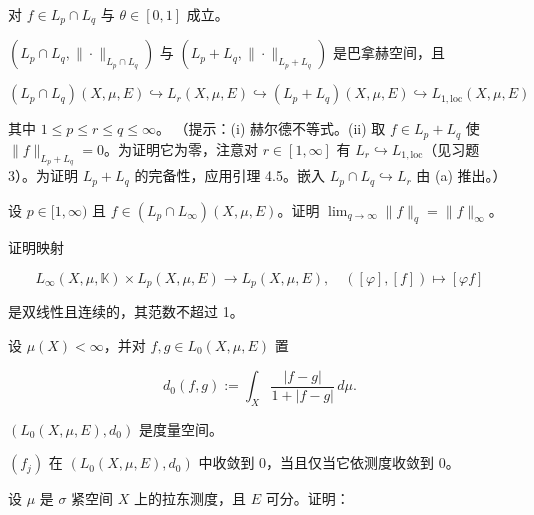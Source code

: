 \begin{exercises}
\begin{subitems}
对 $ f \in L_p \cap L_q $ 与 $ \theta \in [0,1] $ 成立。

\item

$ (L_p\cap L_q, \|\cdot\|_{L_p\cap L_q}) $ 与 $ (L_p+L_q, \|\cdot\|_{L_p+L_q}) $ 是巴拿赫空间，且

\[
(L_p\cap L_q)(X,\mu,E) \hookrightarrow L_r(X,\mu,E) \hookrightarrow (L_p+L_q)(X,\mu,E) \hookrightarrow L_{1,\mathrm{loc}}(X,\mu,E)
\]

其中 $ 1 \le p \le r \le q \le \infty $。
（提示：(i) 赫尔德不等式。(ii) 取 $ f \in L_p+L_q $ 使 $ \|f\|_{L_p+L_q} = 0 $。为证明它为零，注意对 $ r \in [1,\infty] $ 有 $ L_r \hookrightarrow L_{1,\mathrm{loc}} $（见习题 3）。为证明 $ L_p+L_q $ 的完备性，应用引理 4.5。嵌入 $ L_p\cap L_q \hookrightarrow L_r $ 由 (a) 推出。）

\end{subitems}

\item

设 $ p \in [1,\infty) $ 且 $ f \in (L_p \cap L_\infty)(X,\mu,E) $。证明 $ \lim_{q\to\infty}\|f\|_q = \|f\|_\infty $。

\item

证明映射

\[
L_\infty(X,\mu,\mathbb{K}) \times L_p(X,\mu,E) \to L_p(X,\mu,E) , \quad ([\varphi],[f]) \mapsto [\varphi f]
\]

是双线性且连续的，其范数不超过 1。

\item

设 $ \mu(X) < \infty $，并对 $ f,g \in L_0(X,\mu,E) $ 置

\[
d_0(f,g) := \int_X \frac{|f-g|}{1+|f-g|} \, d\mu .
\]

\begin{subitems}
\item

$ (L_0(X,\mu,E),d_0) $ 是度量空间。

\item

$ (f_j) $ 在 $ (L_0(X,\mu,E),d_0) $ 中收敛到 0，当且仅当它依测度收敛到 0。

\end{subitems}

\item

设 $ \mu $ 是 $ \sigma $ 紧空间 $ X $ 上的拉东测度，且 $ E $ 可分。证明：

\begin{subitems}
\item


\end{subitems}
\end{exercises}
